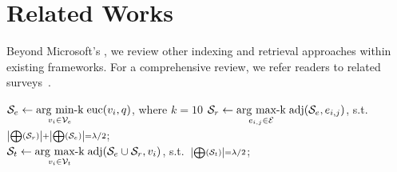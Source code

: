 

\section{Related Works}\label{sec:related}
Beyond Microsoft's \graphrag, we review other indexing and retrieval approaches within existing \graphrag frameworks. For a comprehensive review, we refer readers to related surveys~\cite{peng2024graph,fan24survey}.



\begin{algorithm}[!t]
$\mathcal{S}_e \gets \underset{v_i\in \mathcal{V}_e}{\operatorname{arg}\,\operatorname{min-k}}\; \text{euc}(v_i,q)$, where $k=10$\;
$\mathcal{S}_r \gets \underset{e_{i,j}\in \mathcal{E}}{\operatorname{arg}\,\operatorname{max-k}}\; \text{adj}(\mathcal{S}_e,e_{i,j})$, s.t.\ ${\scriptstyle \left|\bigoplus(\mathcal{S}_r)\right|+\left|\bigoplus(\mathcal{S}_e)\right| = \lambda/2}$;\\
$\mathcal{S}_t \gets \underset{v_{i}\in \mathcal{V}_t}{\operatorname{arg}\,\operatorname{max-k}}\; \text{adj}(\mathcal{S}_e\cup\mathcal{S}_r,v_{i})$, s.t.\ ${\scriptstyle \left|\bigoplus(\mathcal{S}_t)\right| = \lambda/2}$;\\
\caption{\graphretrieval$(\G, q, \lambda)$}
\label{alg:graphrag-retrieval}
\end{algorithm}



